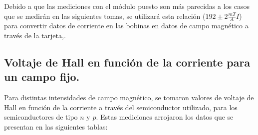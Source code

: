 \documentclass[twocolumn,showkeys,preprintnumbers,amsmath,amssymb]{revtex4}
\begin{document}
		Debido a que las mediciones con el módulo puesto son más parecidas a los casos que se medirán en las siguientes tomas, se utilizará esta relación ($192\pm 2 \frac{mT}{A}I$) para convertir datos de corriente en las bobinas en datos de campo magnético a través de la tarjeta,.
		
	\subsection{\label{subsec:VHallIConst} Voltaje de Hall en función de la corriente para un campo fijo.}
	
		Para distintas intensidades de campo magnético, se tomaron valores de voltaje de Hall en función de la corriente a través del semiconductor utilizado, para los semiconductores de tipo $n$ y $p$. Estas mediciones arrojaron los datos que se presentan en las siguientes tablas:
		
\end{document}

